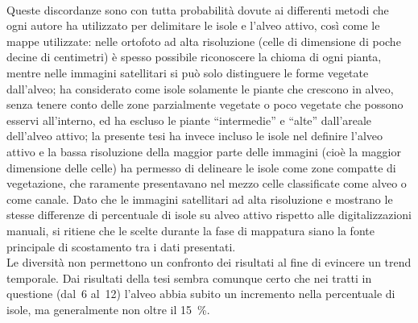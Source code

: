 \\
Queste discordanze sono con tutta probabilità dovute ai differenti metodi che ogni autore ha utilizzato per delimitare le isole e l'alveo attivo, così come le mappe utilizzate:
nelle ortofoto ad alta risoluzione (celle di dimensione di poche decine di centimetri) è spesso possibile riconoscere la chioma di ogni pianta, mentre nelle immagini satellitari si può solo distinguere le forme vegetate dall'alveo;
 ha considerato come isole solamente le piante che crescono in alveo, senza tenere conto delle zone parzialmente vegetate o poco vegetate che possono esservi all'interno, ed ha escluso le piante “intermedie” e “alte” dall'areale dell'alveo attivo;
la presente tesi ha invece incluso le isole nel definire l'alveo attivo e la bassa risoluzione della maggior parte delle immagini (cioè la maggior dimensione delle celle) ha permesso di delineare le isole come zone compatte di vegetazione, che raramente presentavano nel mezzo celle classificate come alveo o come canale.
Dato che le immagini satellitari ad alta risoluzione \Pl{} e \WV{} mostrano le stesse differenze di percentuale di isole su alveo attivo rispetto alle digitalizzazioni manuali, si ritiene che le scelte durante la fase di mappatura siano la fonte principale di scostamento tra i dati presentati.
\\
Le diversità non permettono un confronto dei risultati al fine di evincere un trend temporale.
Dai risultati della tesi sembra comunque certo che nei tratti in questione (dal~6 al~12) l'alveo abbia subito un incremento nella percentuale di isole, ma generalmente non oltre il \SI{15}{\percent}.

